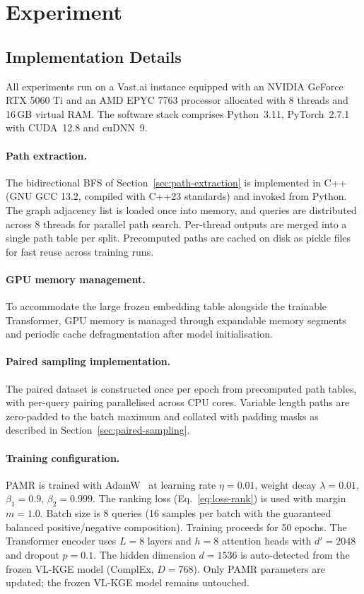 \documentclass[runningheads]{llncs}
\begin{document}
\section{Experiment}
\label{sec:experiment}
\subsection{Implementation Details}
\label{sec:implementation}

All experiments run on a Vast.ai instance equipped with an NVIDIA
GeForce RTX 5060 Ti and an AMD EPYC 7763 processor allocated with 8 threads
and 16\,GB virtual RAM. The software stack comprises Python~3.11,
PyTorch~2.7.1 with CUDA~12.8 and cuDNN~9.

\paragraph{Path extraction.}
The bidirectional BFS of Section~\ref{sec:path-extraction} is
implemented in C++ (GNU GCC 13.2, compiled with C++23 standards)
and invoked from Python. The graph adjacency list is loaded once
into memory, and queries are distributed across 8 threads for
parallel path search. Per-thread outputs are merged into a single
path table per split. Precomputed paths are cached on disk as
pickle files for fast reuse across training runs.

\paragraph{GPU memory management.}
To accommodate the large frozen embedding table alongside the trainable
Transformer, GPU memory is managed through expandable memory segments
and periodic cache defragmentation after model initialisation.

\paragraph{Paired sampling implementation.}
The paired dataset is constructed once per epoch from precomputed
path tables, with per-query pairing parallelised across CPU cores.
Variable length paths are zero-padded to the batch maximum and
collated with padding masks as described in
Section~\ref{sec:paired-sampling}.

\paragraph{Training configuration.}
PAMR is trained with AdamW~\cite{loshchilov2019decoupled} at learning
rate $\eta = 0.01$, weight decay $\lambda = 0.01$, $\beta_1 = 0.9$,
$\beta_2 = 0.999$. The ranking loss (Eq.~\ref{eq:loss-rank}) is
used with margin $m = 1.0$. Batch size is 8 queries (16 samples per
batch with the guaranteed balanced positive/negative composition).
Training proceeds for 50 epochs. The Transformer encoder uses
$L = 8$ layers and $h = 8$ attention heads with
$d' = 2048$ and dropout $p = 0.1$. The hidden dimension
$d = 1536$ is auto-detected from the frozen VL-KGE
model (ComplEx, $D = 768$). Only PAMR parameters are updated; the
frozen VL-KGE model remains untouched.
\end{document}
